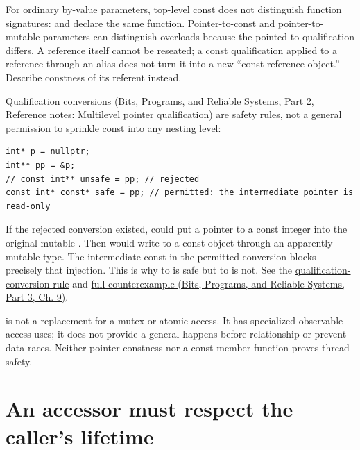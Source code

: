For ordinary by-value parameters, top-level const does not distinguish function signatures:  and  declare the same function. Pointer-to-const and pointer-to-mutable parameters can distinguish overloads because the pointed-to qualification differs. A reference itself cannot be reseated; a const qualification applied to a reference through an alias does not turn it into a new ``const reference object.'' Describe constness of its referent instead.

\href{../01-Bits-Programs-and-Reliable-Systems-P02/main.pdf\#nameddest=appendix-5e1a7561cd98}{Qualification conversions (Bits, Programs, and Reliable Systems, Part 2, Reference notes: Multilevel pointer qualification)} are safety rules, not a general permission to sprinkle const into any nesting level:

\begin{verbatim}
int* p = nullptr;
int** pp = &p;
// const int** unsafe = pp; // rejected
const int* const* safe = pp; // permitted: the intermediate pointer is read-only
\end{verbatim}

If the rejected conversion existed,  could put a pointer to a const integer into the original mutable . Then  would write to a const object through an apparently mutable type. The intermediate const in the permitted conversion blocks precisely that injection. This is why  to  is safe but  to  is not. See the \href{https://eel.is/c++draft/conv.qual}{qualification-conversion rule} and \href{../01-Bits-Programs-and-Reliable-Systems-P03/main.pdf\#nameddest=01-foundations-i-ch011-c---qualification-safety-and-borrow-intervals}{full counterexample (Bits, Programs, and Reliable Systems, Part 3, Ch. 9)}.

 is not a replacement for a mutex or atomic access. It has specialized observable-access uses; it does not provide a general happens-before relationship or prevent data races. Neither pointer constness nor a const member function proves thread safety.

\section{An accessor must respect the caller's lifetime}\label{05-engine-i-ch003-an-accessor-must-respect-the-callers-lifetime}

